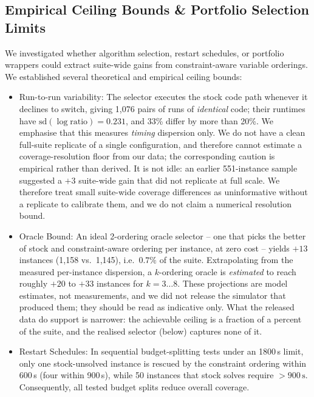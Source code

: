 \documentclass[twocolumn,10pt]{article}
\begin{document}
\subsection{Empirical Ceiling Bounds \& Portfolio Selection Limits}
\label{sec:ceiling}
We investigated whether algorithm selection, restart schedules, or portfolio wrappers could extract suite-wide gains from constraint-aware variable orderings. We established several theoretical and empirical ceiling bounds:

\begin{itemize}\setlength{\itemsep}{2pt}
    \item Run-to-run variability: The selector executes the stock code path whenever it declines to switch, giving 1,076 pairs of runs of \emph{identical} code; their runtimes have $\text{sd}(\log \text{ratio}) = 0.231$, and 33\% differ by more than 20\%. We emphasise that this measures \emph{timing} dispersion only. We do not have a clean full-suite replicate of a single configuration, and therefore cannot estimate a coverage-resolution floor from our data; the corresponding caution is empirical rather than derived. It is not idle: an earlier 551-instance sample suggested a $+3$ suite-wide gain that did not replicate at full scale. We therefore treat small suite-wide coverage differences as uninformative without a replicate to calibrate them, and we do not claim a numerical resolution bound.
    \item Oracle Bound: An ideal 2-ordering oracle selector -- one that picks the better of stock and constraint-aware ordering per instance, at zero cost -- yields $+13$ instances (1,158 vs.\ 1,145), i.e.\ $0.7\%$ of the suite. Extrapolating from the measured per-instance dispersion, a $k$-ordering oracle is \emph{estimated} to reach roughly $+20$ to $+33$ instances for $k = 3 \dots 8$. These projections are model estimates, not measurements, and we did not release the simulator that produced them; they should be read as indicative only. What the released data do support is narrower: the achievable ceiling is a fraction of a percent of the suite, and the realised selector (below) captures none of it.
    \item Restart Schedules: In sequential budget-splitting tests under an 1800\,s limit, only one stock-unsolved instance is rescued by the constraint ordering within 600\,s (four within 900\,s), while 50 instances that stock solves require $>900\,\text{s}$. Consequently, all tested budget splits reduce overall coverage.

\end{itemize}
\end{document}
